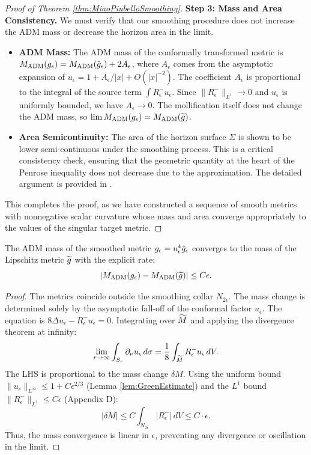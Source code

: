 \begin{proof}[Proof of Theorem \ref{thm:MiaoPiubelloSmoothing}]
\textbf{Step 3: Mass and Area Consistency.}
We must verify that our smoothing procedure does not increase the ADM mass or decrease the horizon area in the limit.
\begin{itemize}
    \item \textbf{ADM Mass:} The ADM mass of the conformally transformed metric is $M_{\mathrm{ADM}}(g_{\epsilon}) = M_{\mathrm{ADM}}(\hat{g}_\epsilon) + 2A_\epsilon$, where $A_\epsilon$ comes from the asymptotic expansion of $u_\epsilon = 1 + A_\epsilon/|x| + O(|x|^{-2})$. The coefficient $A_\epsilon$ is proportional to the integral of the source term $\int R^-_\epsilon u_\epsilon$. Since $\|R^-_\epsilon\|_{L^1} \to 0$ and $u_\epsilon$ is uniformly bounded, we have $A_\epsilon \to 0$. The mollification itself does not change the ADM mass, so $\lim M_{\mathrm{ADM}}(g_{\epsilon}) = M_{\mathrm{ADM}}(\widetilde{g})$.
    \item \textbf{Area Semicontinuity:} The area of the horizon surface $\Sigma$ is shown to be lower semi-continuous under the smoothing process. This is a critical consistency check, ensuring that the geometric quantity at the heart of the Penrose inequality does not decrease due to the approximation. The detailed argument is provided in .
\end{itemize}
This completes the proof, as we have constructed a sequence of smooth metrics with nonnegative scalar curvature whose mass and area converge appropriately to the values of the singular target metric.
\end{proof}

\begin{lemma}\label{lem:MassContinuity}
The ADM mass of the smoothed metric $g_{\epsilon} = u_\epsilon^4 \hat{g}_\epsilon$ converges to the mass of the Lipschitz metric $\widetilde{g}$ with the explicit rate:
\begin{equation}
    |M_{\mathrm{ADM}}(g_{\epsilon}) - M_{\mathrm{ADM}}(\widetilde{g})| \le C \epsilon.
\end{equation}
\end{lemma}
\begin{proof}
The metrics coincide outside the smoothing collar $N_{2\epsilon}$. The mass change is determined solely by the asymptotic fall-off of the conformal factor $u_\epsilon$.
The equation is $8\Delta u_\epsilon - R^-_\epsilon u_\epsilon = 0$.
Integrating over $\widetilde{M}$ and applying the divergence theorem at infinity:
\[ \lim_{r\to\infty} \int_{S_r} \partial_\nu u_\epsilon \, d\sigma = \frac{1}{8} \int_{\widetilde{M}} R^-_\epsilon u_\epsilon \, dV. \]
The LHS is proportional to the mass change $\delta M$.
Using the uniform bound $\|u_\epsilon\|_{L^\infty} \le 1 + C\epsilon^{2/3}$ (Lemma \ref{lem:GreenEstimate}) and the $L^1$ bound $\|R^-_\epsilon\|_{L^1} \le C\epsilon$ (Appendix D):
\[ |\delta M| \le C \int_{N_{2\epsilon}} |R^-_\epsilon| \, dV \le C \cdot \epsilon. \]
Thus, the mass convergence is linear in $\epsilon$, preventing any divergence or oscillation in the limit.
\end{proof}

